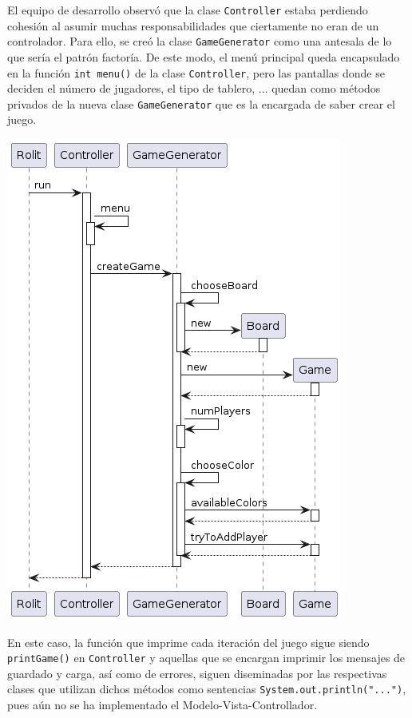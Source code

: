\documentclass[../DocumentoOficial.tex]{subfiles}
\begin{document}
\begin{sprint}[3]
El equipo de desarrollo observó que la clase \texttt{Controller} estaba perdiendo cohesión al asumir muchas responsabilidades que ciertamente no eran de un controlador. Para ello, se creó la clase \texttt{GameGenerator} como una antesala de lo que sería el patrón factoría. De este modo, el menú principal queda encapsulado en la función \texttt{int menu()} de la clase \texttt{Controller}, pero las pantallas donde se deciden el número de jugadores, el tipo de tablero, ... quedan como métodos privados de la nueva clase \texttt{GameGenerator} que es la encargada de saber crear el juego.
\begin{center}
\includegraphics[scale=0.55]{MenuPpal_sprint3_seq}
\end{center}
En este caso, la función que imprime cada iteración del juego sigue siendo \texttt{printGame()} en \texttt{Controller} y aquellas que se encargan imprimir los mensajes de guardado y carga, así como de errores, siguen diseminadas por las respectivas clases que utilizan dichos métodos como sentencias \texttt{System.out.println("...")}, pues aún no se ha implementado el Modelo-Vista-Controllador.
\end{sprint}
\end{document}
